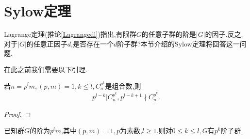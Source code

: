 \section{Sylow定理}
Lagrange定理(推论\ref{Lagrangedl})指出,有限群$G$的任意子群的阶是$|G|$的因子.反之,对于$|G|$的任意正因子$d$,是否存在一个$d$阶子群?本节介绍的Sylow定理将回答这一问题.

在此之前我们需要以下引理.
\begin{lemma}\label{p79yl}
    若$n=p^lm,(p,m)=1,k\leq l,C_n^{p^k}$是组合数,则\begin{align*}
        p^{l-k}|C_n^{p^k},p^{l-k+1}\nmid C_n^{p^k}.
    \end{align*}
\end{lemma}
\begin{proof}
    \stars
\end{proof}
\begin{theorem}\label{xldydl}
    已知群$G$的阶为$p^lm$,其中$(p,m)=1,p$为素数,$l\geq1$.则对$0\leq k\leq l,G$有$p^k$阶子群.
\end{theorem}
